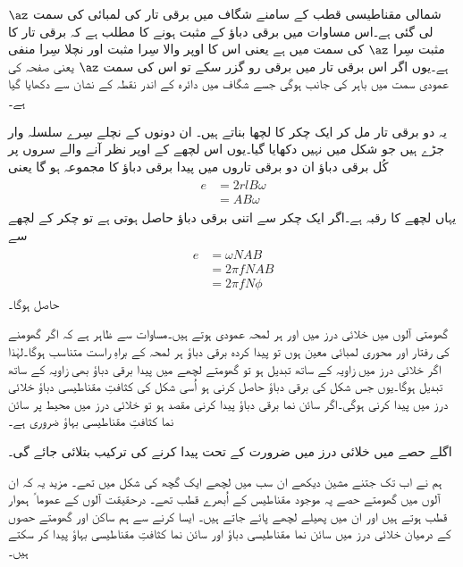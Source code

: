 شمالی مقناطیسی قطب کے سامنے شگاف میں برقی تار کی لمبائی کی سمت $\az$ لی گئی ہے۔اس مساوات میں برقی دباؤ کے مثبت ہونے کا مطلب ہے کہ برقی تار کا مثبت سِرا $\az$ کی سمت میں ہے یعنی اس کا اوپر والا سِرا مثبت اور نچلا  سِرا منفی ہے۔یوں اگر اس برقی تار میں برقی رو گزر سکے تو اس کی سمت $\az$ یعنی صفحہ کی عمودی سمت میں باہر کی جانب ہوگی جسے شگاف میں دائرہ کے اندر نقطہ کے نشان سے دکھایا گیا ہے۔ 

یہ دو برقی تار مل کر ایک چکر کا لچھا بناتے ہیں۔ ان دونوں کے نچلے سِرے سلسلہ وار جڑے ہیں جو شکل میں نہیں دکھایا گیا۔یوں اس لچھے کے اوپر نظر آنے والے سروں پر کُل برقی دباؤ  ان دو برقی تاروں میں پیدا برقی دباؤ  کا مجموعہ ہو گا یعنی
\begin{gather}
\begin{aligned}
e&=2r l B \omega\\
&=A B \omega
\end{aligned}
\end{gather}
یہاں لچھے کا رقبہ   ہے۔اگر ایک چکر سے اتنی برقی دباؤ حاصل ہوتی ہے تو  چکر کے لچھے  سے
\begin{gather}
\begin{aligned}
e&=\omega N A B\\
&=2 \pi f N A B\\
&=2 \pi f N \phi
\end{aligned}
\end{gather}
حاصل ہوگا۔

گھومتی آلوں میں خلائی درز میں   اور   ہر لمحہ عمودی ہوتے ہیں۔مساوات  سے ظاہر ہے کہ اگر گھومنے کی رفتار اور محوری لمبائی معین ہوں تو پیدا کردہ برقی دباؤ  ہر لمحہ   کے براہِ راست متناسب ہوگا۔لہٰذا اگر خلائی درز میں زاویہ کے ساتھ   تبدیل ہو تو گھومتے لچھے میں پیدا برقی دباؤ بھی زاویہ کے ساتھ تبدیل ہوگا۔یوں جس شکل کی برقی دباؤ حاصل کرنی ہو اُسی شکل کی کثافتِ مقناطیسی دباؤ خلائی درز میں پیدا کرنی ہوگی۔اگر سائن نما برقی دباؤ پیدا کرنی مقصد ہو تو خلائی درز میں محیط پر سائن نما کثافتِ مقناطیسی بہاؤ ضروری ہے۔

اگلے حصے میں خلائی درز میں ضرورت کے تحت   پیدا کرنے کی ترکیب بتلائی جائے گی۔

ہم نے اب تک جتنے مشین دیکھے ان سب میں لچھے ایک گچھ کی شکل میں تھے۔ مزید یہ کہ ان آلوں میں گھومتے حصے پہ موجود مقناطیس کے اُبھرے قطب تھے۔ درحقیقت آلوں کے عموما ً ہموار قطب ہوتے ہیں اور ان میں پھیلے لچھے پائے جاتے ہیں۔ ایسا کرنے سے ہم ساکن اور گھومتے حصوں کے درمیان خلائی درز میں سائن نما مقناطیسی دباؤ اور سائن نما  کثافتِ مقناطیسی بہاؤ پیدا کر سکتے ہیں۔ 

